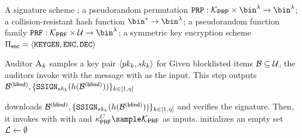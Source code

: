 \begin{algorithm}
\caption{\bfACB: Bloom Filter Based Blocklist}
\label{acb:bf}
\footnotesize
\begin{algorithmic}[1]

\Require A signature scheme \sigSchemeDefn; a pseudorandom permutation $\prp: \prpKeySpace \times \bin^{\secParam} \rightarrow \bin^{\secParam}$; a collision-resistant hash function $\bin^{\ast} \rightarrow \bin^{\secParam}$; a pseudorandom function family $\prf: \prfKeySpace \times \universe \rightarrow \bin^{\secParam}$; a symmetric key encryption scheme $\encryptionSchemeDefn$




\Statex\Procedure{\publishList}{\blocklist}


\State Auditor $\auditor[\auditorIdx]$ samples a key pair $\langle \auditorPubKeyGenericScheme[\auditorIdx], \auditorPrivKeyGenericScheme[\auditorIdx] \rangle$ for \sigScheme 
\State Given blocklisted items $\blocklist \subseteq \universe$, the auditors invoke \authOPRFFunc with the \publishList message with \blocklist as the input. This step outputs $\blindedBlocklist, \{ \signGenSig[\auditorPrivKeyGenericScheme[\auditorIdx]](\hashFn(\blindedBlocklist)) \}_{\auditorIdx \in [1, \numAuditors]}$
\EndProcedure


\Statex\Procedure{\preprocess}{\blindedBlocklist}



\State \client downloads $\blindedBlocklist, \{ \signGenSig[\auditorPrivKeyGenericScheme[\auditorIdx]](\hashFn(\blindedBlocklist)) \}_{\auditorIdx \in [1, \numAuditors]}$ and verifies the signature. Then, it invokes \authOPRFFunc with \evaluate with \blindedBlocklist and $\prfKeyClient \sample \prfKeySpace$ as inputs. 
\State \client initializes an empty set $\mathcal{L} \gets \emptyset$


\end{algorithmic}
\end{algorithm}
